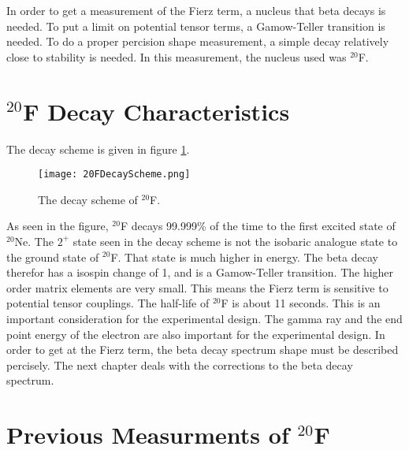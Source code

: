 \documentclass[main.tex]{subfiles}
\begin{document}
In order to get a measurement of the Fierz term, a nucleus that beta decays is needed.
To put a limit on potential tensor terms, a Gamow-Teller transition is needed.
To do a proper percision shape measurement, a simple decay relatively close to stability is needed. 
In this measurement, the nucleus used was $^{20}$F.
 
\section{$^{20}$F Decay Characteristics}
The decay scheme is given in figure \ref{fig:DecayScheme}.

\begin{figure}[!htb]
	\centerline{\texttt{[image: 20FDecayScheme.png]}}
	\caption{The decay scheme of $^{20}$F.}
	\label{fig:DecayScheme}
\end{figure}

As seen in the figure, $^{20}$F decays 99.999\% of the time to the first excited state of $^{20}$Ne.
The $2^{+}$ state seen in the decay scheme is not the isobaric analogue state to the ground state of $^{20}$F.
That state is much higher in energy.
The beta decay therefor has a isospin change of 1, and is a Gamow-Teller transition.
The higher order matrix elements are very small.
This means the Fierz term is sensitive to potential tensor couplings.
The half-life of $^{20}$F is about 11 seconds. 
This is an important consideration for the experimental design.
The gamma ray and the end point energy of the electron are also important for the experimental design.
In order to get at the Fierz term, the beta decay spectrum shape must be described percisely.
The next chapter deals with the corrections to the beta decay spectrum.  

\section{Previous Measurments of $^{20}$F}
\end{document}
